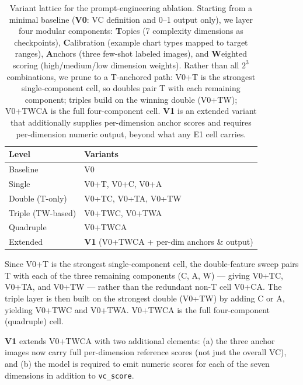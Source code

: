 \begin{table}[t]
  \centering
  \caption{Variant lattice for the prompt-engineering ablation.
    Starting from a minimal baseline (\textbf{V0}: VC definition and
    0--1 output only), we layer four modular components:
    \textbf{T}opics (7 complexity dimensions as checkpoints),
    \textbf{C}alibration (example chart types mapped to target ranges),
    \textbf{A}nchors (three few-shot labeled images), and
    \textbf{W}eighted scoring (high/medium/low dimension weights).
    Rather than all $2^3$ combinations, we prune to a T-anchored path:
    V0+T is the strongest single-component cell, so doubles pair T with
    each remaining component; triples build on the winning double
    (V0+TW); V0+TWCA is the full four-component cell.
    \textbf{V1} is an extended variant that additionally supplies
    per-dimension anchor scores and requires per-dimension numeric
    output, beyond what any E1 cell carries.}
  \label{tab:variant-lattice}
  \small
  \begin{tabular*}{\linewidth}{@{\extracolsep{\fill}}ll@{}}
    \toprule
    Level & Variants\\
    \midrule
    Baseline          & V0\\
    Single            & V0+T, V0+C, V0+A\\
    Double (T-only)   & V0+TC, V0+TA, V0+TW\\
    Triple (TW-based) & V0+TWC, V0+TWA\\
    Quadruple         & V0+TWCA\\
    Extended          & \textbf{V1} (V0+TWCA + per-dim anchors \& output)\\
    \bottomrule
  \end{tabular*}
\end{table}

Since V0+T is the strongest single-component cell, the double-feature
sweep pairs T with each of the three remaining components (C, A, W) ---
giving V0+TC, V0+TA, and V0+TW --- rather than the redundant non-T cell
V0+CA. The triple layer is then built on the strongest double (V0+TW) by
adding C or A, yielding V0+TWC and V0+TWA. V0+TWCA is the full
four-component (quadruple) cell.

\textbf{V1} extends V0+TWCA with two additional elements: (a) the three
anchor images now carry full per-dimension reference scores (not just the
overall VC), and (b) the model is required to emit numeric scores for each
of the seven dimensions in addition to \texttt{vc\_score}.

